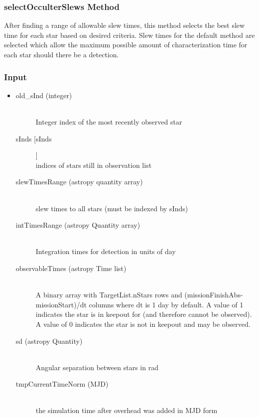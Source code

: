 \documentclass[cleanfoot]{asme2ej}
\begin{document}
\subsubsection{selectOcculterSlews Method} \label{sec:selectOcculterSlewstask}
After finding a range of allowable slew times, this method selects the best slew time for each star based on desired criteria. Slew times for the default method are selected which allow the maximum possible amount of characterization time for each star should there be a detection. 

\subsubsection*{Input}
\begin{itemize}
\item
\begin{description}
    \item[old\_sInd (integer)] \hfill \\ Integer index of the most recently observed star
    \item[sInds [sInds]] \hfill \\ indices of stars still in observation list
    \item[slewTimesRange (astropy quantity array)] \hfill \\ slew times to all stars (must be indexed by sInds)
    \item[intTimesRange (astropy Quantity array)] \hfill \\ Integration times for detection in units of day
    \item[observableTimes (astropy Time list)] \hfill \\ A binary array with TargetList.nStars rows and (missionFinishAbs-missionStart)/dt columns where dt is 1 day by default. A value of 1 indicates the star is in keepout for (and therefore cannot be observed). A value of 0 indicates the star is not in keepout and may be observed.
    \item[sd (astropy Quantity)] \hfill \\ Angular separation between stars in rad
    \item[tmpCurrentTimeNorm (MJD)] \hfill \\ the simulation time after overhead was added in MJD form
\end{description}
\end{itemize}
\end{document}
